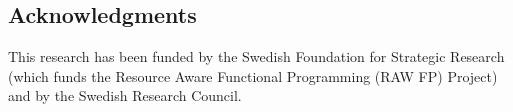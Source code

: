 

\subsection*{Acknowledgments} %
This research has been funded by the Swedish Foundation for
Strategic Research (which funds the Resource Aware Functional 
Programming (RAW FP) Project) and by the Swedish Research Council.


%







